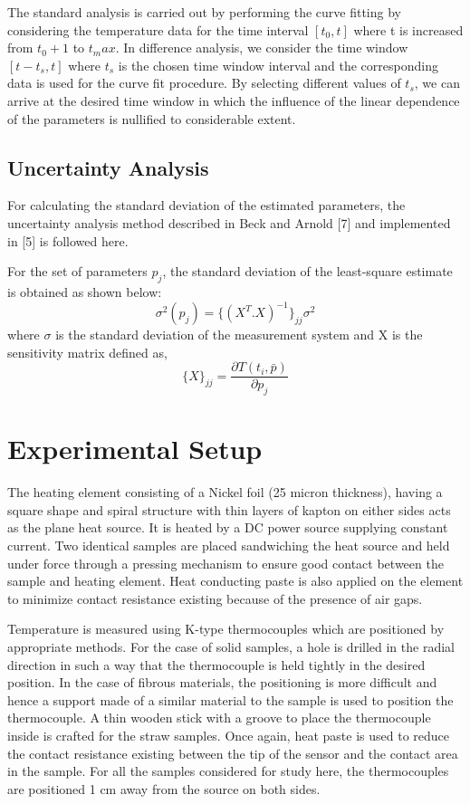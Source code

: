 \documentclass[12pt]{article}
\begin{document}
The standard analysis is carried out by performing the curve fitting by considering the temperature data for 
the time interval $[t_0,t]$ where t is increased from $t_0 + 1$ to $t_max$. In difference analysis, we consider the time window $[t - t_s,t]$ where $t_s$ is the chosen time window interval and the corresponding data is used 
for the curve fit procedure. By selecting different values of $t_s$, we can arrive at the desired time window in which the influence of the linear dependence of the parameters is nullified to considerable extent. 

\subsection*{Uncertainty Analysis}


For calculating the standard deviation of the estimated parameters, the
uncertainty analysis method described in Beck and Arnold {[}7{]} and
implemented in {[}5{]} is followed here.

 For the set of parameters $p_j$, the standard deviation of the
least-square estimate is obtained as shown below:
\begin{equation}
\sigma^2(p_j) = \{(X^T.X)^{-1}\}_{jj}\sigma^2
\end{equation}
where \(\sigma\) is the standard deviation of the measurement system and
X is the sensitivity matrix defined as,
\begin{equation}
\{X\}_{jj} = \frac{\partial T(t_i, \bar{p})}{\partial p_j}
\end{equation}


\section*{Experimental Setup}

The heating element consisting of a Nickel foil (25 micron thickness),
having a square shape and spiral structure with thin layers of kapton on
either sides acts as the plane heat source. It is heated by a DC power
source supplying constant current. Two identical samples are placed
sandwiching the heat source and held under force through a pressing
mechanism to ensure good contact between the sample and heating element.
Heat conducting paste is also applied on the element to minimize
contact resistance existing because of the presence of air gaps.

Temperature is measured using K-type thermocouples which are positioned
by appropriate methods. For the case of solid samples, a hole is drilled
in the radial direction in such a way that the thermocouple is held
tightly in the desired position. In the case of fibrous materials, the
positioning is more difficult and hence a support made of a similar
material to the sample is used to position the thermocouple. A thin
wooden stick with a groove to place the thermocouple inside is crafted
for the straw samples. Once again, heat paste is used to reduce the
contact resistance existing between the tip of the sensor and the
contact area in the sample. For all the samples considered for study here, the thermocouples
are positioned 1 cm away from the source on both sides.
\end{document}
